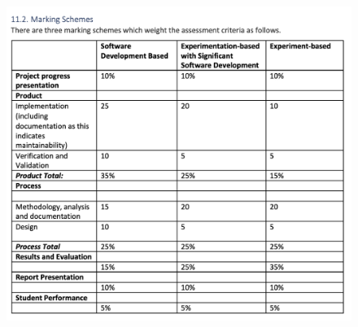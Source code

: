 \begin{figure}[h]
    \centering
    \includegraphics[width=\textwidth]{figs/marking.png}

\end{figure}


